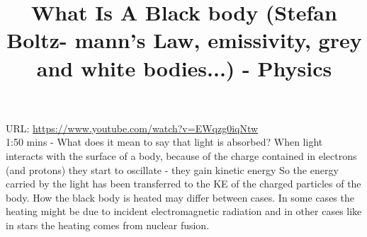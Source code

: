 \documentclass{../template/texnote}
\title{What Is A Black body (Stefan Boltz-
mann’s Law, emissivity, grey and white
bodies...) - Physics}
\begin{document}
    \maketitle {}
URL: \url{https://www.youtube.com/watch?v=EWqzg0iqNtw}
\\

1:50 mins - What does it mean to say that light is absorbed? 
When light interacts with the surface of a body, because of the charge contained in electrons (and protons) they start to oscillate  - they gain kinetic energy 
So the energy carried by the light has been transferred to the KE of the charged particles of the body.
How the black body is heated may differ between cases. In some cases the heating might be due to incident electromagnetic radiation and in other cases like in stars the heating comes from nuclear fusion.


    \printbibliography
\end{document}
